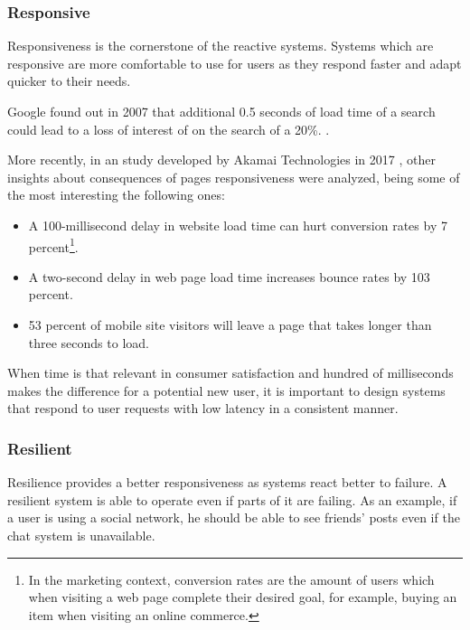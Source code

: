 \documentclass[../main.tex]{subfiles}
\begin{document}
\subsubsection{Responsive}

Responsiveness is the cornerstone of the reactive
systems. Systems which are responsive are more comfortable to use for users as
they respond faster and adapt quicker to their needs.

Google found out in 2007 that additional 0.5 seconds of load time of a search
could lead to a loss of interest of on the search of a 20\%. \autocite{MayerGoogleYouTube}.

More recently, in an study developed by Akamai Technologies in 2017 \autocite{Akamai2017ThePerformance}, other
insights about consequences of pages responsiveness were analyzed, being some of the most
interesting the following ones:

\begin{itemize}
    \item A 100-millisecond delay in website load time can hurt conversion rates
by 7 percent\footnote{In the marketing context, conversion rates are the amount of users
    which when visiting a web page complete their desired goal, for example, buying an item
    when visiting an online commerce.}.

    \item A two-second delay in web page load time increases bounce rates by 103
percent.

    \item 53 percent of mobile site visitors will leave a page that takes longer
than three seconds to load.
\end{itemize}

When time is that relevant in consumer satisfaction and hundred of milliseconds
makes the difference for a potential new user, it is important to design systems
that respond to user requests with low latency in a consistent manner.

\subsubsection{Resilient}

Resilience provides a better responsiveness as systems
react better to failure. A resilient system is able to operate even if parts of
it are failing. As an example, if a user is using a social network, he should be
able to see friends' posts even if the chat system is unavailable.
\end{document}
